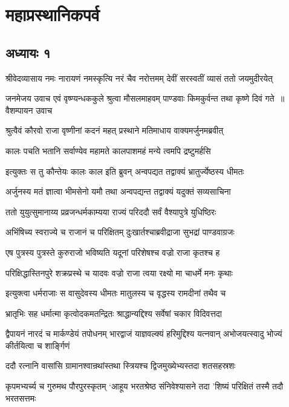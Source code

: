 \part{महाप्रस्थानिकपर्व}
\chapter{अध्यायः १}
\threelineshloka
{श्रीवेदव्यासाय नमः}
{नारायणं नमस्कृत्यि नरं चैव नरोत्तमम्}
{देवीं सरस्वतीं व्यासं ततो जयमुदीरयेत्}


\fourlineindentedshloka
{जनमेजय उवाच}
{एवं वृष्ण्यन्धककुले श्रुत्वा मौसलमाहवम्}
{पाण्डवाः किमकुर्वन्त तथा कृष्णे दिवं गते ॥वैशम्पायन उवाच}
{}


\twolineshloka
{श्रुत्वैवं कौरवो राजा वृष्णीनां कदनं महत्}
{प्रस्थाने मतिमाधाय वाक्यमर्जुनमब्रवीत्}


\twolineshloka
{कालः पचति भतानि सर्वाण्येव महामते}
{कालपाशमहं मन्ये त्वमपि द्रष्टुमर्हसि}


\twolineshloka
{इत्युक्तः स तु कौन्तेयः कालः काल इति ब्रुवन्}
{अन्वपद्यत तद्वाक्यं भ्रातुर्ज्येष्ठस्य धीमतः}


\twolineshloka
{अर्जुनस्य मतं ज्ञात्वा भीमसेनो यमौ तथा}
{अन्वपद्यन्त तद्वाक्यं यदुक्तं सव्यसाचिना}


\twolineshloka
{ततो युयुत्सुमानाय्य प्रव्रजन्धर्मकाम्यया}
{राज्यं परिददौ सर्वं वैश्यापुत्रे युधिष्ठिरः}


\twolineshloka
{अभिंषिच्य स्वराज्ये च राजानं च परिक्षितम्}
{दुःखार्तश्चाब्रवीद्राजा सुभद्रां पाण्डवाग्रजः}


\twolineshloka
{एष पुत्रस्य पुत्रस्ते कुरुराजो भविष्यति}
{यदूनां परिशेषश्च वज्रो राजा कृतश्च ह}


\twolineshloka
{परिक्षिद्धास्तिनपुरे शक्रप्रस्थे च यादवः}
{वज्रो राजा त्वया रक्ष्यो मा चाधर्मे मनः कृथाः}


\twolineshloka
{इत्युक्त्वा धर्मराजाः स वासुदेवस्य धीमतः}
{मातुलस्य च वृद्धस्य रामदीनां तथैव च}


\twolineshloka
{भ्रातृभिः सह धर्मात्मा कृत्वोदकमतन्द्रितः}
{श्राद्धान्यद्दिश्य सर्वेषां चकार विदिवत्तदा}


\threelineshloka
{द्वैपायनं नारदं च मार्कण्डेयं तपोधनम्}
{भारद्वाजं याज्ञवल्क्यं हरिमुद्दिश्य यत्नवान्}
{अभोजयत्स्वादु भोज्यं कीर्तयित्वा च शार्ङ्गिणं}


\twolineshloka
{ददौ रत्नानि वासांसि ग्रामानश्वान्रथांस्तथा}
{स्त्रियश्च द्विजमुख्येभ्यस्तदा शतसहस्रशः}


\threelineshloka
{कृपमभ्यर्च्य च गुरुमथ पौरपुरस्कृतम्}
{`आहूय भरतश्रेष्ठ संनिवेश्यासने तदा}
{'शिष्यं परिक्षितं तस्मै तदौ भरतसत्तमः}


